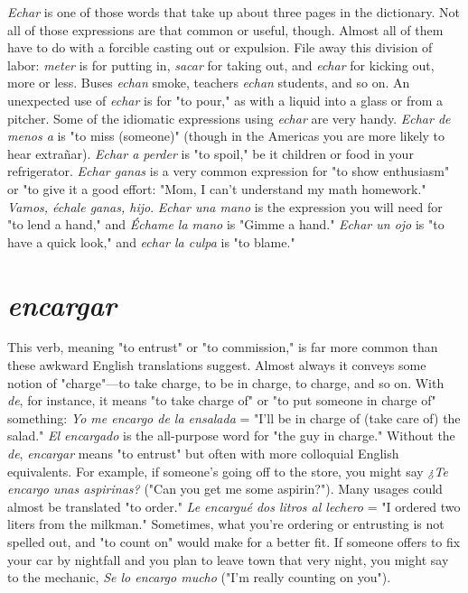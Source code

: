 \documentclass[14pt,a4paper,oneside]{memoir}
\begin{document}
\emph{Echar} is one of those words that take up about three pages in
the dictionary. Not all of those expressions are that common or useful,
though. Almost all of them have to do with a forcible casting out or
expulsion. File away this division of labor: \emph{meter} is for putting in, \emph{sacar} for taking out, and \emph{echar} for kicking out, more or less. Buses \emph{echan}
smoke, teachers \emph{echan} students, and so on. An unexpected use of
\emph{echar} is for "to pour," as with a liquid into a glass or from a pitcher.
Some of the idiomatic expressions using \emph{echar} are very handy. \emph{Echar
de menos a} is "to miss (someone)" (though in the Americas you are
more likely to hear extrañar). \emph{Echar a perder} is "to spoil," be it children or food in your refrigerator. \emph{Echar ganas} is a very common
expression for "to show enthusiasm" or "to give it a good effort: "Mom,
I can't understand my math homework." \emph{Vamos, échale ganas, hijo}.
\emph{Echar una mano} is the expression you will need for "to lend a hand,"
and \emph{Échame la mano} is "Gimme a hand." \emph{Echar un ojo} is "to have a
quick look," and \emph{echar la culpa} is "to blame."

\section{\emph{encargar}}

This verb, meaning "to entrust" or "to commission," is far
more common than these awkward English translations suggest. Almost always it conveys some notion of "charge"---to take charge, to be
in charge, to charge, and so on. With \emph{de}, for instance, it means "to take
charge of" or "to put someone in charge of" something: \emph{Yo me encargo
de la ensalada} = "I'll be in charge of (take care of) the salad." \emph{El encargado} is the all-purpose word for "the guy in charge." Without the
\emph{de}, \emph{encargar} means "to entrust" but often with more colloquial English equivalents. For example, if someone's going off to the store, you
might say \emph{¿Te encargo unas aspirinas?} ("Can you get me some aspirin?"). Many usages could almost be translated "to order." \emph{Le encargué
dos litros al lechero} = "I ordered two liters from the milkman." Sometimes, what you're ordering or entrusting is not spelled out, and "to
count on" would make for a better fit. If someone offers to fix your car
by nightfall and you plan to leave town that very night, you might say
to the mechanic, \emph{Se lo encargo mucho} ("I'm really counting on you").
\end{document}

